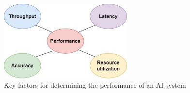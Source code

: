 \begin{figure}[htb]
    \centering
    \includegraphics[width=0.6\textwidth]{pics/performance.jpg}
    \caption{Key factors for determining the performance of an AI system}
    \label{fig:performance}
\end{figure}


